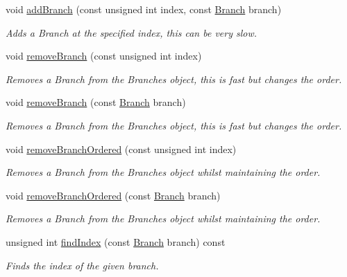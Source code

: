 \begin{DoxyCompactItemize}
void \hyperlink{classTree_a8515bc0f3003f1d13cbe582cedfbe6ae}{add\+Branch} (const unsigned int index, const \hyperlink{classTree_a9acb980cd198358d57fb2a6e5d65c85b}{Branch} branch)
\begin{DoxyCompactList}\small\item\em Adds a Branch at the specified index, this can be very slow. \end{DoxyCompactList}\item 
void \hyperlink{classTree_ac851df39dc89e9a8c60b4898d8012fd7}{remove\+Branch} (const unsigned int index)
\begin{DoxyCompactList}\small\item\em Removes a Branch from the Branches object, this is fast but changes the order. \end{DoxyCompactList}\item 
void \hyperlink{classTree_a8976206e549d5e8eb127928bdfb35971}{remove\+Branch} (const \hyperlink{classTree_a9acb980cd198358d57fb2a6e5d65c85b}{Branch} branch)
\begin{DoxyCompactList}\small\item\em Removes a Branch from the Branches object, this is fast but changes the order. \end{DoxyCompactList}\item 
void \hyperlink{classTree_a05cffee2182f101a56aec75bd4229f52}{remove\+Branch\+Ordered} (const unsigned int index)
\begin{DoxyCompactList}\small\item\em Removes a Branch from the Branches object whilst maintaining the order. \end{DoxyCompactList}\item 
void \hyperlink{classTree_a43deacc7a03b8a86c0239de1ebbbd2c5}{remove\+Branch\+Ordered} (const \hyperlink{classTree_a9acb980cd198358d57fb2a6e5d65c85b}{Branch} branch)
\begin{DoxyCompactList}\small\item\em Removes a Branch from the Branches object whilst maintaining the order. \end{DoxyCompactList}\item 
unsigned int \hyperlink{classTree_aa680ed5fc071515455a20a13592e3900}{find\+Index} (const \hyperlink{classTree_a9acb980cd198358d57fb2a6e5d65c85b}{Branch} branch) const 
\begin{DoxyCompactList}\small\item\em Finds the index of the given branch. \end{DoxyCompactList}\end{DoxyCompactItemize}
